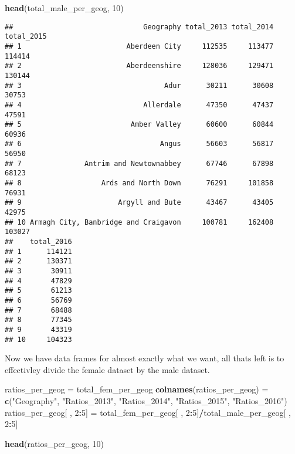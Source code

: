 \documentclass[]{article}
\newenvironment{Shaded}{\begin{snugshade}}{\end{snugshade}}
\newcommand{\KeywordTok}[1]{\textcolor[rgb]{0.13,0.29,0.53}{\textbf{#1}}}
\newcommand{\DecValTok}[1]{\textcolor[rgb]{0.00,0.00,0.81}{#1}}
\newcommand{\StringTok}[1]{\textcolor[rgb]{0.31,0.60,0.02}{#1}}
\newcommand{\OperatorTok}[1]{\textcolor[rgb]{0.81,0.36,0.00}{\textbf{#1}}}
\newcommand{\NormalTok}[1]{#1}
\begin{document}
\begin{Shaded}
\begin{Highlighting}[]
\KeywordTok{head}\NormalTok{(total_male_per_geog, }\DecValTok{10}\NormalTok{)}
\end{Highlighting}
\end{Shaded}

\begin{verbatim}
##                               Geography total_2013 total_2014 total_2015
## 1                         Aberdeen City     112535     113477     114414
## 2                         Aberdeenshire     128036     129471     130144
## 3                                  Adur      30211      30608      30753
## 4                             Allerdale      47350      47437      47591
## 5                          Amber Valley      60600      60844      60936
## 6                                 Angus      56603      56817      56950
## 7               Antrim and Newtownabbey      67746      67898      68123
## 8                   Ards and North Down      76291     101858      76931
## 9                       Argyll and Bute      43467      43405      42975
## 10 Armagh City, Banbridge and Craigavon     100781     162408     103027
##    total_2016
## 1      114121
## 2      130371
## 3       30911
## 4       47829
## 5       61213
## 6       56769
## 7       68488
## 8       77345
## 9       43319
## 10     104323
\end{verbatim}

Now we have data frames for almost exactly what we want, all thats left
is to effectivley divide the female dataset by the male dataset.

\begin{Shaded}
\begin{Highlighting}[]
\NormalTok{ratios_per_geog =}\StringTok{ }\NormalTok{total_fem_per_geog}
\KeywordTok{colnames}\NormalTok{(ratios_per_geog) =}\StringTok{ }\KeywordTok{c}\NormalTok{(}\StringTok{"Geography"}\NormalTok{, }\StringTok{"Ratios_2013"}\NormalTok{, }\StringTok{"Ratios_2014"}\NormalTok{,}
                              \StringTok{"Ratios_2015"}\NormalTok{, }\StringTok{"Ratios_2016"}\NormalTok{)}
\NormalTok{ratios_per_geog[ , }\DecValTok{2}\OperatorTok{:}\DecValTok{5}\NormalTok{] =}\StringTok{ }\NormalTok{total_fem_per_geog[ , }\DecValTok{2}\OperatorTok{:}\DecValTok{5}\NormalTok{]}\OperatorTok{/}\NormalTok{total_male_per_geog[ , }\DecValTok{2}\OperatorTok{:}\DecValTok{5}\NormalTok{]}

\KeywordTok{head}\NormalTok{(ratios_per_geog, }\DecValTok{10}\NormalTok{)}
\end{Highlighting}
\end{Shaded}
\end{document}
